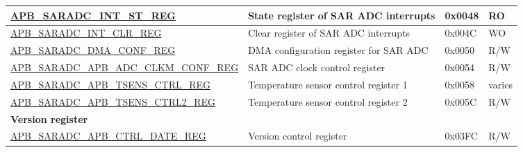 \begin{longtable}{ | p{7cm} | p{5.2cm} | p{1.3cm} | p{1cm} | }
\hyperref[regdesc:APBSARADCINTSTREG]{APB\_SARADC\_INT\_ST\_REG} & State register of SAR ADC interrupts & 0x0048 & RO \\ \hline
\hyperref[regdesc:APBSARADCINTCLRREG]{APB\_SARADC\_INT\_CLR\_REG} & Clear register of SAR ADC interrupts & 0x004C & WO \\ \hline
\hyperref[regdesc:APBSARADCDMACONFREG]{APB\_SARADC\_DMA\_CONF\_REG} & DMA configuration register for SAR ADC & 0x0050 & R/W \\ \hline
\hyperref[regdesc:APBSARADCCLKMCONFREG]{APB\_SARADC\_APB\_ADC\_CLKM\_CONF\_REG} & SAR ADC clock control register & 0x0054 & R/W \\ \hline
\hyperref[regdesc:APBSARADCAPBTSENSCTRLREG]{APB\_SARADC\_APB\_TSENS\_CTRL\_REG} & Temperature sensor control register 1 & 0x0058 & varies \\ \hline
\hyperref[regdesc:APBSARADCTSENSCTRL2REG]{APB\_SARADC\_APB\_TSENS\_CTRL2\_REG} & Temperature sensor control register 2 & 0x005C & R/W \\ \hline
\multicolumn{4}{|l|}{\textbf{Version register}} \\ \hline
\hyperref[regdesc:APBSARADCCTRLDATEREG]{APB\_SARADC\_APB\_CTRL\_DATE\_REG} & Version control register & 0x03FC & R/W \\ \hline
\end{longtable}
